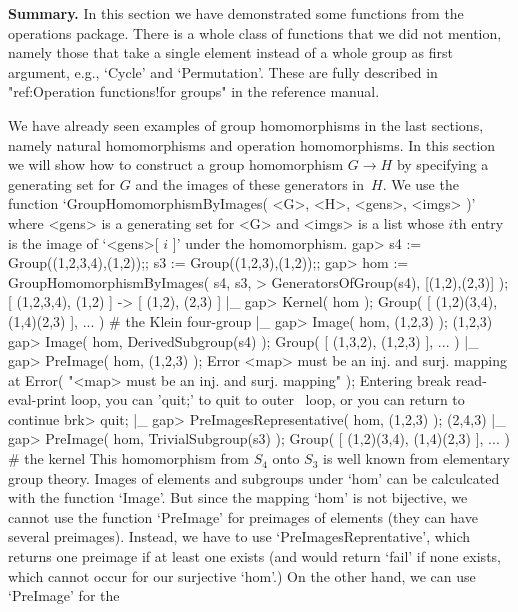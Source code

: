 {\bf  Summary.} In this section we  have demonstrated some functions from
the operations package. There  is a whole class of  functions that we did
not mention, namely  those that take a  single element instead of a whole
group as first argument, e.g., `Cycle' and `Permutation'. These are fully
described   in "ref:Operation  functions!for   groups"  in the  reference
manual.


We   have already  seen  examples of   group homomorphisms  in  the  last
sections,  namely natural homomorphisms  and  operation homomorphisms. In
this section we will show how to construct a  group homomorphism $G\to H$
by specifying a generating set for $G$ and the images of these generators
in~$H$. We use the function `GroupHomomorphismByImages( <G>, <H>, <gens>,
<imgs> )' where <gens> is a  generating set for <G> and  <imgs> is a list
whose $i$th entry is the image of `<gens>[ $i$ ]' under the homomorphism.
\beginexample
    gap> s4 := Group((1,2,3,4),(1,2));; s3 := Group((1,2,3),(1,2));;
    gap> hom := GroupHomomorphismByImages( s4, s3,
    >           GeneratorsOfGroup(s4), [(1,2),(2,3)] );
    [ (1,2,3,4), (1,2) ] -> [ (1,2), (2,3) ]
|_
    gap> Kernel( hom );
    Group( [ (1,2)(3,4), (1,4)(2,3) ], ... )  # the Klein four-group
|_
    gap> Image( hom, (1,2,3) );
    (1,2,3)
    gap> Image( hom, DerivedSubgroup(s4) );
    Group( [ (1,3,2), (1,2,3) ], ... )
|_
    gap> PreImage( hom, (1,2,3) );
    Error <map> must be an inj. and surj. mapping at
    Error( "<map> must be an inj. and surj. mapping" );
    Entering break read-eval-print loop, you can 'quit;' to quit to outer \
    loop,
    or you can return to continue
    brk> quit;
|_
    gap> PreImagesRepresentative( hom, (1,2,3) );
    (2,4,3)
|_
    gap> PreImage( hom, TrivialSubgroup(s3) );
    Group( [ (1,2)(3,4), (1,4)(2,3) ], ... )  # the kernel
\endexample
This homomorphism  from $S_4$ onto  $S_3$  is well known  from elementary
group theory.  Images   of elements and  subgroups  under   `hom' can  be
calculcated with the function `Image'. But since the mapping `hom' is not
bijective, we  cannot use   the   function `PreImage' for  preimages   of
elements  (they can have   several preimages). Instead,   we have  to use
`PreImagesReprentative', which  returns  one  preimage if at    least one
exists (and would  return `fail' if none  exists, which  cannot occur for
our surjective `hom'.)  On the other hand, we  can use `PreImage' for the
